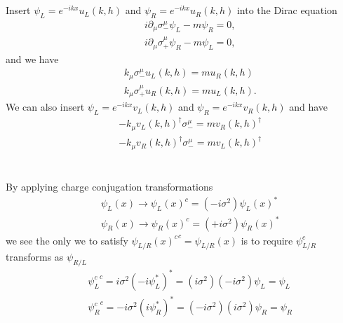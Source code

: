 \documentclass[11pt]{article}
\def\del{{\partial}}
\begin{document}
\section{ }
Insert $\psi_L=e^{-ikx} u_L(k,h)$ and $\psi_R=e^{-ikx} u_R(k,h)$ into the Dirac equation
\begin{eqnarray}
    && i\del_\mu \sigma_-^\mu \psi_L - m \psi_R = 0, \\
    && i\del_\mu \sigma_+^\mu \psi_R - m \psi_L = 0, 
\end{eqnarray}
and we have
\begin{eqnarray}
    &&k_\mu \sigma_-^\mu u_L(k,h) = m u_R(k,h) \\
    && k_\mu \sigma_+^\mu u_R(k,h) = m u_L(k,h).
\end{eqnarray}
We can also insert $\psi_L=e^{-ikx} v_L(k,h)$ and $\psi_R=e^{-ikx} v_R(k,h)$ and have
\begin{eqnarray}
    && -k_\mu v_L(k,h)^\dagger \sigma_-^\mu = m v_R(k,h)^\dagger  \\
    && -k_\mu v_R(k,h)^\dagger \sigma_-^\mu = m v_L(k,h)^\dagger
\end{eqnarray}

\section{ }
By applying charge conjugation transformations
\begin{eqnarray}
    && \psi_L(x) \to \psi_L(x)^c = (-i\sigma^2) \psi_L(x)^* \\
    && \psi_R(x) \to \psi_R(x)^c = (+i\sigma^2) \psi_R(x)^* 
\end{eqnarray}
we see the only we to satisfy ${\psi_{L/R}(x)^c}^c = \psi_{L/R}(x)$ is to require $\psi_{L/R}^c$ transforms as $\psi_{R/L}$
\begin{eqnarray}
    &&{\psi_L^c}^c=i\sigma^2 (-i\psi_L^*)^*=(i\sigma^2)(-i\sigma^2)\psi_L=\psi_L\\
    &&{\psi_R^c}^c=-i\sigma^2 (i\psi_R^*)^*=(-i\sigma^2)(i\sigma^2)\psi_R=\psi_R
\end{eqnarray}
\end{document}
